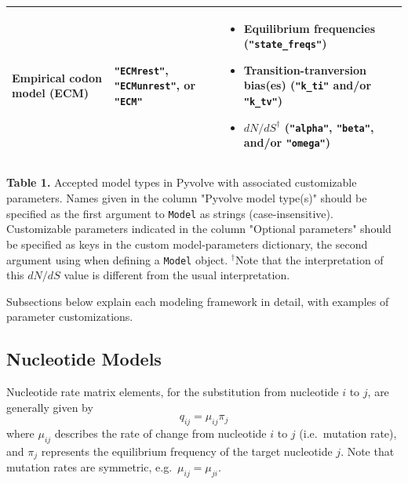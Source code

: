 \documentclass{article}
\newcommand{\code}[1]{\texttt{\small{#1}}}
\begin{document}
\begin{table}[H]
{{\begin{tabular}{>{\centering\arraybackslash}p{1.5in} >{\centering\arraybackslash}p{2in} >{\raggedright}p{4in}}
		
				
		Empirical codon model (ECM) & \code{"ECMrest"}, \code{"ECMunrest"}, or \code{"ECM"} & \vspace{-\topsep} \begin{itemize}[leftmargin=*] 
																								\item Equilibrium frequencies (\code{"state\_freqs"})
																								\item Transition-tranversion bias(es) (\code{"k\_ti"} and/or \code{"k\_tv"})																																		\item $dN/dS^\dagger$ (\code{"alpha"}, \code{"beta"}, and/or \code{"omega"})
																									\end{itemize} \tabularnewline		
	\hline

		\end{tabular}}}
\begin{flushleft}
\footnotesize{\textbf{Table 1.} Accepted model types in Pyvolve with associated customizable parameters. Names given in the column "Pyvolve model type(s)" should be specified as the first argument to \code{\footnotesize{Model}} as strings (case-insensitive). Customizable parameters indicated in the column "Optional parameters" should be specified as keys in the custom model-parameters dictionary, the second argument using when defining a \code{\footnotesize{Model}} object. \newline $^\dagger$Note that the interpretation of this $dN/dS$ value is different from the usual interpretation.}
\end{flushleft}	
\end{table}

Subsections below explain each modeling framework in detail, with examples of parameter customizations.


\subsection{Nucleotide Models}\label{sec:nucleotide_basic}

Nucleotide rate matrix elements, for the substitution from nucleotide $i$ to $j$, are generally given by 
\begin{equation}
q_{ij} = \mu_{ij} \pi_j
\end{equation}
where $\mu_{ij}$ describes the rate of change from nucleotide $i$ to $j$ (i.e.\ mutation rate), and $\pi_j$ represents the equilibrium frequency of the target nucleotide $j$. Note that mutation rates are symmetric, e.g.\ $\mu_{ij} = \mu_{ji}$. 
\end{document}
